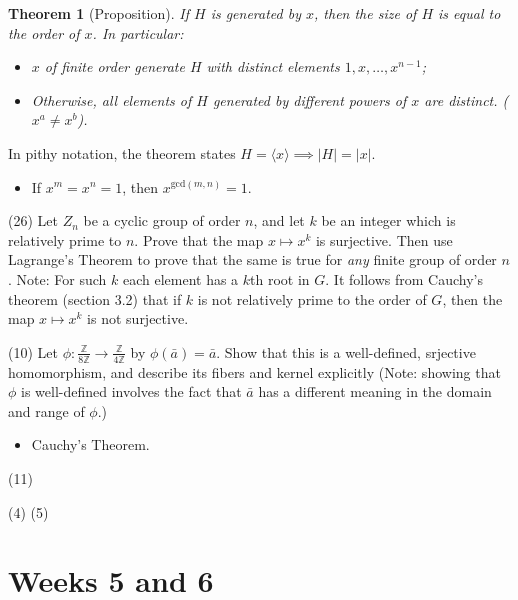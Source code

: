\documentclass[1    0pt, answers]{exam} \renewcommand{\baselinestretch}{1.05}
\theoremstyle{plain}
\newtheorem{theorem}{Theorem}
\theoremstyle{definition}
\begin{document}
\begin{questions}
\begin{theorem}[Proposition]
If $H$ is generated by $x$, then the size of $H$ is equal to the order of $x$. In particular:
\begin{itemize}
\item $x$ of finite order generate $H$ with distinct elements $1, x, \ldots, x^{n-1}$;
\item Otherwise, all elements of $H$ generated by different powers of $x$ are distinct. ($x^a \neq x^b$).
\end{itemize}
\end{theorem}
In pithy notation, the theorem states $H = \langle x \rangle \implies |H| = |x|$.

\begin{itemize}
\item If $x^m = x^n = 1$, then $x^{\text{gcd}(m,n)} = 1$.
\end{itemize}


\question (26) Let $Z_n$ be a cyclic group of order $n$, and let $k$ be an integer which is relatively prime to $n$. Prove that the map $x \mapsto x^k$ is surjective. Then use Lagrange's Theorem to prove that the same is true for \emph{any} finite group of order $n$. Note: For such $k$ each element has a $k$th root in $G$. It follows from Cauchy's theorem (section 3.2) that if $k$ is not relatively prime to the order of $G$, then the map $x \mapsto x^k$ is not surjective.


\question (10) Let $\phi : \frac{\mathbb{Z}}{8 \mathbb{Z}} \to \frac{\mathbb{Z}}{4 \mathbb{Z}}$ by $\phi(\bar{a}) = \bar{a}$. Show that this is a well-defined, srjective homomorphism, and describe its fibers and kernel explicitly (Note: showing that $\phi$ is well-defined involves the fact that $\bar{a}$ has a different meaning in the domain and range of $\phi$.)

\begin{itemize}
\item Cauchy's Theorem.
\end{itemize}

\question (11)

\question (4)
\question (5)


\end{questions}

\section{Weeks 5 and 6}
\end{document}

